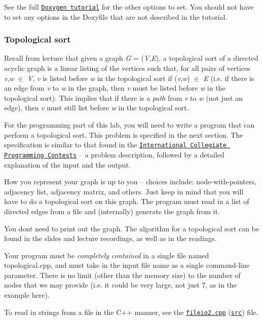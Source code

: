 See the full \href{../../tutorials/11-doxygen/index.html}{\tt Doxygen tutorial} for the other options to set. You should not have to set any options in the Doxyfile that are not described in the tutorial.

\subsubsection*{Topological sort}

Recall from lecture that given a graph {\itshape G} = ({\itshape V},{\itshape E}), a topological sort of a directed acyclic graph is a linear listing of the vertices such that, for all pairs of vertices {\itshape v},{\itshape w} {$\in$} {\itshape V}, {\itshape v} is listed before {\itshape w} in the topological sort if ({\itshape v},{\itshape w}) {$\in$} {\itshape E} (i.\+e. if there is an edge from {\itshape v} to {\itshape w} in the graph, then {\itshape v} must be listed before {\itshape w} in the topological sort). This implies that if there is a {\itshape path} from {\itshape v} to {\itshape w} (not just an edge), then {\itshape v} must still list before {\itshape w} in the topological sort.

For the programming part of this lab, you will need to write a program that can perform a topological sort. This problem is specified in the next section. The specification is similar to that found in the \href{http://acmicpc.org}{\tt International Collegiate Programming Contests} -- a problem description, followed by a detailed explanation of the input and the output.

How you represent your graph is up to you -- choices include\+: node-\/with-\/pointers, adjacency list, adjacency matrix, and others. Just keep in mind that you will have to do a topological sort on this graph. The program must read in a list of directed edges from a file and (internally) generate the graph from it.

You don\textquotesingle{}t need to print out the graph. The algorithm for a topological sort can be found in the slides and lecture recordings, as well as in the readings.

Your program must be {\itshape completely contained} in a single file named topological.\+cpp, and must take in the input file name as a single command-\/line parameter. There is no limit (other than the memory size) to the number of nodes that we may provide (i.\+e. it could be very large, not just 7, as in the example here).

To read in strings from a file in the C++ manner, see the \href{fileio2.cpp.html}{\tt fileio2.\+cpp} (\href{fileio2.cpp}{\tt src}) file.

